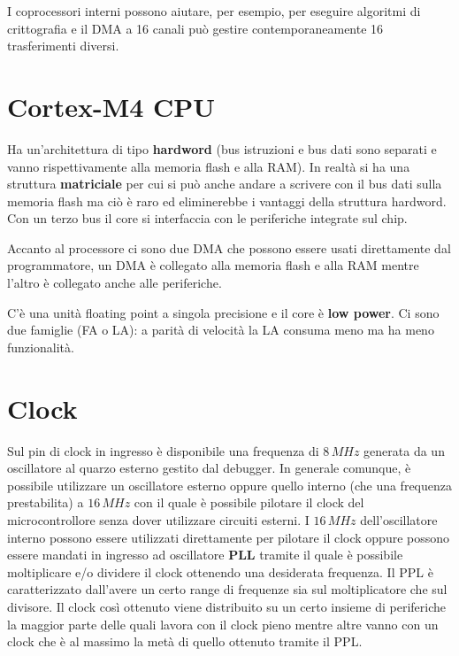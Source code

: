 \documentclass[12pt, a4paper]{report}
\begin{document}
I coprocessori interni possono aiutare, per esempio, per eseguire algoritmi di crittografia e il DMA a 16 canali può gestire contemporaneamente 16 trasferimenti diversi.

\section{Cortex-M4 CPU}
Ha un'architettura di tipo \textbf{hardword} (bus istruzioni e bus dati sono separati e vanno rispettivamente alla memoria flash e alla RAM). In realtà si ha una struttura \textbf{matriciale} per cui si può anche andare a scrivere con il bus dati sulla memoria flash ma ciò è raro ed eliminerebbe i vantaggi della struttura hardword. Con un terzo bus il core si interfaccia con le periferiche integrate sul chip.

Accanto al processore ci sono due DMA che possono essere usati direttamente dal programmatore, un DMA è collegato alla memoria flash e alla RAM mentre l'altro è collegato anche alle periferiche.

C'è una unità floating point a singola precisione e il core è \textbf{low power}. Ci sono due famiglie (FA o LA): a parità di velocità la LA consuma meno ma ha meno funzionalità.

\section{Clock}
Sul pin di clock in ingresso è disponibile una frequenza di $8\,\textit{MHz}$ generata da un oscillatore al quarzo esterno gestito dal debugger. In generale comunque, è possibile utilizzare un oscillatore esterno oppure quello interno (che una frequenza prestabilita) a $16\,\textit{MHz}$ con il quale è possibile pilotare il clock del microcontrollore senza dover utilizzare circuiti esterni. I $16\,\textit{MHz}$ dell'oscillatore interno possono essere utilizzati direttamente per pilotare il clock oppure possono essere mandati in ingresso ad oscillatore \textbf{PLL} tramite il quale è possibile moltiplicare e/o dividere il clock ottenendo una desiderata frequenza. Il PPL è caratterizzato dall'avere un certo range di frequenze sia sul moltiplicatore che sul divisore. Il clock così ottenuto viene distribuito su un certo insieme di periferiche la maggior parte delle quali lavora con il clock pieno mentre altre vanno con un clock che è al massimo la metà di quello ottenuto tramite il PPL.
\end{document}
